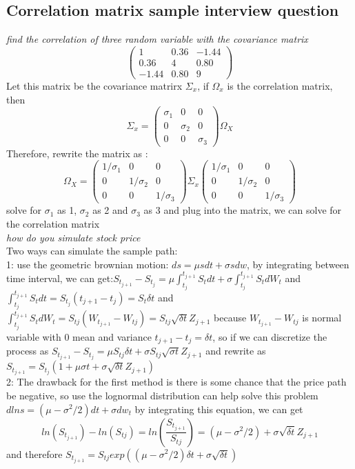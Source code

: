 \documentclass[a4paper,11pt]{article}
\begin{document}
\subsection{Correlation matrix sample interview question}
{\em find the correlation of three random variable with the covariance matrix}
$$
\begin{pmatrix}
1 & 0.36 & -1.44 \\
0.36 & 4 & 0.80  \\
-1.44 & 0.80 & 9
\end{pmatrix}
$$
Let this matrix be the covariance matrirx $\Sigma_x$, if $\Omega_x$ is the correlation matrix, then \\
 $$
 \Sigma_x=
\begin{pmatrix}
\sigma_1 & 0 & 0 \\
0 & \sigma_2 & 0 \\
0 & 0 & \sigma_3
\end{pmatrix}
\Omega_X
$$
Therefore, rewrite the matrix as :\\
$$
\Omega_X =
\begin{pmatrix}
1/\sigma_1 & 0 & 0 \\
0 & 1/\sigma_2 & 0 \\
0 & 0 & 1/\sigma_3
\end{pmatrix}
\Sigma_x
\begin{pmatrix}
1/\sigma_1 & 0 & 0 \\
0 & 1/\sigma_2 & 0 \\
0 & 0 & 1/\sigma_3
\end{pmatrix}
$$
solve for $\sigma_1$ as 1, $\sigma_2$ as 2 and $\sigma_3$ as 3 and plug into the matrix, we can solve for the correlation matrix \\
{\em how do you simulate stock price}\\
Two ways can simulate the sample path:\\
1: use the geometric brownian motion: $ds=\mu s dt+\sigma s dw$, by integrating between time interval, we can get:$S_{t_{j+1}}-S_{t_j}=\mu \int_{t_j}^{t_{j+1}} S_t dt+ \sigma \int_{t_j}^{t_{j+1}} S_t dW_t$ and$\int_{t_j}^{t_{j+1}} S_t dt=S_{t_j}(t_{j+1}-t_j)=S_t\delta t$ and $\int_{t_j}^{t_{j+1}} S_t dW_t = S_{tj}(W_{t_{j+1}}-W_{tj})= S_{tj} \sqrt{\delta t} Z_{j+1}$ because $W_{t_{j+1}}-W_{tj}$ is normal variable with 0 mean and variance $t_{j+1}-t_{j}=\delta t$, so if we can discretize the process as
$S_{t_{j+1}}-S_{t_j}=\mu S_{tj}\delta t+\sigma S_{tj} \sqrt{\sigma t} Z_{j+1}$
and rewrite as $S_{t_{j+1}}=S_{t_j}(1+\mu \sigma t+\sigma \sqrt{\delta t} Z_{j+1})$\\
2: The drawback for the first method is there is some chance that the price path be negative, so use the lognormal distribution can help solve this problem $dlns=(\mu-\sigma^2/2)dt+\sigma dw_t$
by integrating this equation, we can get
$$
ln(S_{t_{j+1}})-ln(S_{tj})=ln(\frac {S_{t_{j+1}}}{S_{tj}})=(\mu-\sigma^2/2)+\sigma \sqrt{\delta t}Z_{j+1}
$$
and therefore $S_{t_{j+1}}=S_{tj} exp( (\mu-\sigma^2/2)\delta t+\sigma \sqrt{\delta t})$
\end{document}
